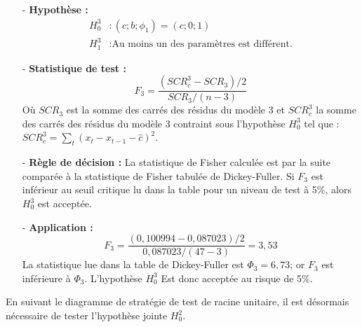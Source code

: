 \begin{itemize}
\item[-]\textbf{Hypothèse :} 
\begin{equation*}
    \begin{split}
        H_{0}^{3} &: (c; b; \phi_{1}) = (c;0;1)\\
        H_{1}^{3} &: \text{Au moins un des paramètres est différent.}
    \end{split}
\end{equation*}
\item[-]\textbf{Statistique de test :} 
\begin{equation*}
    F_{3} = \frac{(SCR_{c}^{3} - SCR_{3})/2}{SCR_{3}/(n-3)}
\end{equation*}
Où $SCR_{3}$ est la somme des carrés des résidus du modèle 3 et $SCR_{c}^{3}$ la somme des carrés des résidus du modèle 3 contraint sous l'hypothèse $H_{0}^{3}$ tel que :
$SCR_{c}^{3} = \sum_{t} \left(x_{t} - x_{t-1} - \hat{c}\right)^{2}$.
\item[-]\textbf{Règle de décision :} La statistique de Fisher calculée est par la suite comparée à la statistique de Fisher tabulée de Dickey-Fuller. Si $F_{3}$ est 
inférieur au seuil critique lu dans la table pour un niveau de test à 5\%, alors $H_{0}^{3}$ est acceptée.
\item[-]\textbf{Application :} 
\begin{equation*}
    F_{3} = \frac{(0,100994 -  0,087023)/2}{0,087023/(47-3)} = 3,53
\end{equation*}
La statistique lue dans la table de Dickey-Fuller est $\Phi_{3} = 6,73$; or $F_{3}$ est inférieure à $\Phi_{3}$. L'hypothèse $H_{0}^{3}$ Est donc acceptée au risque 
de 5\%.
\end{itemize}
%
En suivant le diagramme de stratégie de test de racine unitaire, il est désormais nécessaire de tester l'hypothèse jointe $H_{0}^{2}$.
%

